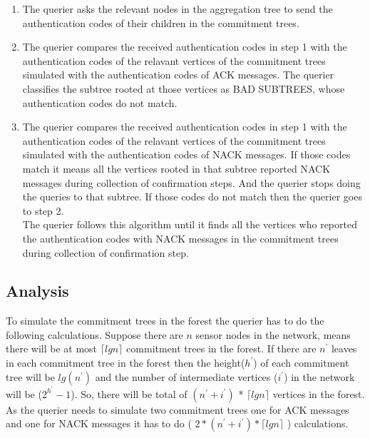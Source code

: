 \begin{enumerate}
 
   \item 
  The querier asks the relevant nodes in the aggregation tree to send the authentication codes of their children in the commitment trees.

  \item
  The querier compares the received authentication codes in step 1 with the authentication codes of the relavant vertices of the commitment trees simulated with the authentication codes of ACK messages. The querier classifies the subtree rooted at those vertices as BAD SUBTREES, whose authentication codes do not match.

  \item 
  The querier compares the received authentication codes in step 1 with the authentication codes of the relavant vertices of the commitment trees simulated with the authentication codes of NACK messages. If those codes match it means all the vertices rooted in that subtree reported NACK messages during collection of confirmation steps. And the querier stops doing the queries to that subtree. If those codes do not match then the querier goes to step 2. \\

  The querier follows this algorithm until it finds all the vertices who reported the authentication codes with NACK messages in the commitment trees during collection of confirmation step.

\end{enumerate}




\subsection{Analysis} %
\label{sub:analysis}

To simulate the commitment trees in the forest the querier has to do the following calculations. Suppose there are $n$ sensor nodes in the network, means there will be at most $\lceil lg n \rceil$ commitment trees in the forest. If there are $n^{'}$ leaves in each commitment tree in the forest then the height($h^{'}$) of each commitment tree will be $lg(n^{'})$ and the number of intermediate vertices ($i^{'}$) in the network will be ($ 2^{h^{'}} - 1 $). So, there will be total of  $ (n^{'} + i^{'}) $ * $\lceil lg  n \rceil $  vertices in the forest. As the querier needs to simulate two commitment trees one for ACK messages and one for NACK messages it has to do ( $ 2 * (n^{'} + i^{'}) * \lceil lg  n \rceil $ ) calculations.

